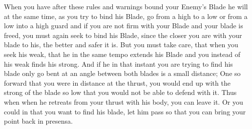 When you have after these rules and warnings bound your Enemy's Blade
he will at the same time, as you try to bind his Blade, go from a high
to a low or from a low into a high guard and if you are not firm with
your Blade and your blade is freed, you must again seek to bind his
Blade, since the closer you are with your blade to his, the better and
safer it is. But you must take care, that when you seek his weak, that
he in the same tempo extends his Blade and you instead of his weak
finds his strong. And if he in that instant you are trying to find his
blade only go bent at an angle between both blades is a
small distance; One so forward that you were in distance at the
thrust, you would end up with the strong of the blade so low that you
would not be able to defend with it. Thus when when he retreats from
your thrust with his body, you can leave it. Or you could in that you
want to find his blade, let him pass so that you can bring your point
back in presensa.


